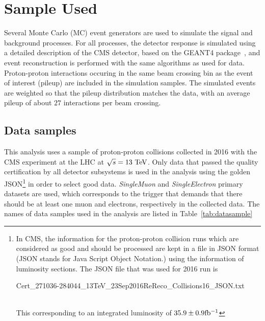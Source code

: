 





\section{Sample Used} %
\label{sec:sample_used}
Several Monte Carlo (MC) event generators are used to simulate the signal and
background processes. For all processes, the detector response is simulated using a detailed description of the CMS detector, based on the \textsc{GEANT4} 
package~\cite{Agostinelli:2002hh}, and event reconstruction is performed with
the same algorithms as used for data. Proton-proton interactions occuring in the same beam crossing bin as the event of interest (pileup) are included in the simulation samples. The simulated events are weighted so that the pileup distribution matches the data, with an average pileup of about $27$ interactions per beam crossing.

\subsection{Data samples}

This analysis uses a sample of proton-proton collisions collected in 2016 with the CMS experiment at the LHC at $\sqrt{s} = 13~\rm{TeV}$.
Only data that passed the quality certification by all detector subsystems is used in the analysis using the golden JSON\footnote{In CMS, the information for the proton-proton collision runs which are considered as good and should be processed are kept in a file in JSON format (JSON stands for Java Script Object Notation.) using the information of luminosity sections. The JSON file that was used for 2016 run is
\\
\centerline{\small Cert\_271036-284044\_13TeV\_23Sep2016ReReco\_Collisions16\_JSON.txt}\\
This corresponding to an integrated luminosity of $35.9 \pm 0.9\mathrm{fb^{-1}}$
} in order to select good data. {\it SingleMuon}  and {\it SingleElectron} primary datasets are used, which corresponds to the trigger that demands that there should be at least one muon and electrons, respectively in the collected data. The names of data samples used in the analysis are listed in Table~\ref{tab:datasample} 

